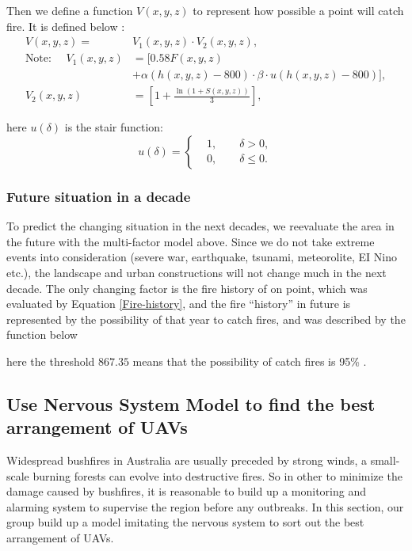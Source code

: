 \documentclass[13pt]{ctexart} %
\begin{document}
Then we define a function $V(x,y,z)$ to represent how possible a point will catch fire. It is defined below :
\begin{equation}\label{PossibilityFire}
    \begin{aligned}
        V(x,y,z) =& V_1(x,y,z)\cdot V_2(x,y,z), \\
        \text{Note: }\quad V_1(x,y,z) &= [
            0.58 F(x,y,z)\\
           & +\alpha\left(
                h(x,y,z)-800
                 \right)\cdot
                 \beta\cdot u(h(x,y,z)-800)
            ], \\
        V_2(x,y,z) &=\left[
            1+\frac{\ln \left(1+S\left(x,y,z\right)\right)}{3}
            \right],
    \end{aligned}
\end{equation}

here $u(\delta)$ is the stair function:
\begin{equation}\label{Stair}%
    u(\delta)=
    \left\{
    \begin{aligned}
         & 1,\qquad \delta> 0,\\
         & 0,\qquad \delta\leq 0.
    \end{aligned}
    \right.
\end{equation}

\subsubsection{Future situation in a decade}
To predict the changing situation in the next decades, we reevaluate the area in the future with the multi-factor model above. Since we do not take extreme events into consideration (severe war, earthquake, tsunami, meteorolite, EI Nino etc.), the landscape and urban constructions will not change much in the next decade. The only changing factor is the fire history of on point, which was evaluated by Equation \ref{Fire-history}, and the fire “history” in future is represented by the possibility of that year to catch fires, and was described by the function below


here the threshold $867.35$ means that the possibility of catch fires is 95\% .


\subsection{Use Nervous System Model to find the best arrangement of UAVs}
Widespread bushfires in Australia are usually preceded by strong winds, a small-scale burning forests can evolve into destructive fires. So in other to minimize the damage caused by bushfires, it is reasonable to build up a monitoring and alarming system to supervise the region before any outbreaks. In this section, our group build up a model imitating the nervous system to sort out the best arrangement of UAVs.
\end{document}
